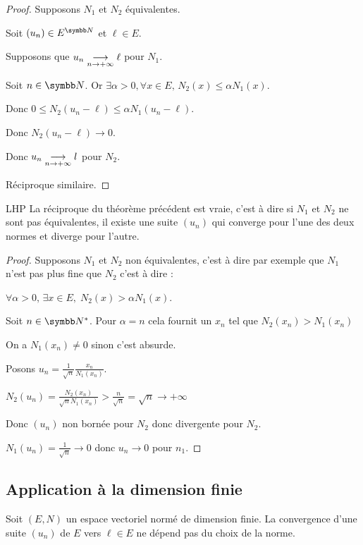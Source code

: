 \begin{proof}
    Supposons $N_1$ et $N_2$ équivalentes.

    Soit $(u_n) \in E^{\N}$ et $\ell \in E$.

    Supposons que $u_n \underset{n \to +\infty}{\longrightarrow} \ell$ pour $N_1$. 

    Soit $n \in \N$. 
    Or $\exists \alpha > 0, \forall x \in E, \, N_2(x) \leqslant \alpha N_1(x)$.

    Donc $0 \leqslant N_2(u_n - \ell) \leqslant \alpha N_1(u_n - \ell)$.

    Donc $N_2(u_n - \ell) \to 0$.

    Donc $u_n \underset{n \to +\infty}{\longrightarrow} l$ pour $N_2$.

    Réciproque similaire.
\end{proof}

\begin{theoreme}{LHP}{}
    La réciproque du théorème précédent est vraie, c'est à dire si $N_1$ et $N_2$ ne sont pas 
    équivalentes, il existe une suite $(u_n)$ qui converge pour l'une des deux normes 
    et diverge pour l'autre. 
\end{theoreme}


\begin{proof}
    Supposons $N_1$ et $N_2$ non équivalentes, c'est à dire par exemple que $N_1$ n'est pas plus 
    fine que $N_2$ c'est à dire : 

    $\forall \alpha >0, \, \exists x \in E, \; N_2(x) > \alpha N_1(x)$.

    Soit $n \in \N^*$. Pour $\alpha = n$ cela fournit un $x_n$ tel que $N_2(x_n) > N_1(x_n)$

    On a $N_1(x_n) \neq 0$ sinon c'est absurde.

    Posons $\displaystyle u_n = \frac 1 {\sqrt n}\frac{x_n}{N_1(x_n)}$.

    $\displaystyle N_2(u_n) = \frac{N_2(x_n)}{\sqrt n N_1(x_n)} > \frac n {\sqrt n} = \sqrt n \to + \infty$

    Donc $(u_n)$ non bornée pour $N_2$ donc divergente pour $N_2$. 

    $N_1(u_n) =  \frac 1 {\sqrt n} \to 0$ donc $u_n \to 0$ pour $n_1$.
\end{proof}

\subsection{Application à la dimension finie}
\begin{theoreme}{}{}
    Soit $(E, N)$ un espace vectoriel normé de dimension finie. La convergence d'une suite $(u_n)$ de $E$
    vers $\ell \in E$ ne dépend pas du choix de la norme. 
\end{theoreme}

